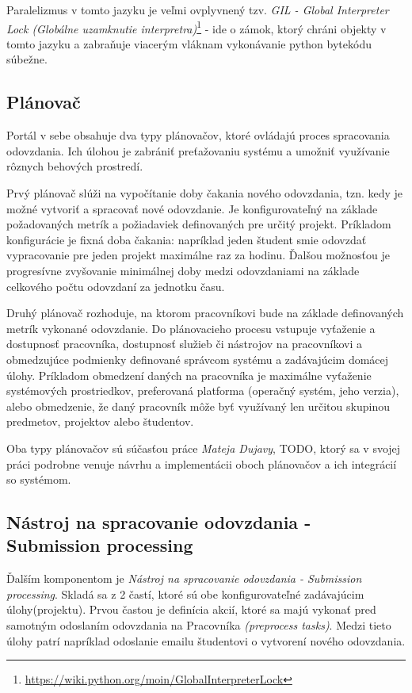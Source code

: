 \documentclass[
  digital, %
  twoside, %
  table,   %
  lof,     %
  lot,     %
]{fithesis3}
\begin{document}
Paralelizmus v tomto jazyku je veľmi ovplyvnený tzv. \emph{GIL - Global Interpreter Lock (Globálne uzamknutie interpretra)}\footnote{\url{https://wiki.python.org/moin/GlobalInterpreterLock}} - ide o zámok, ktorý chráni objekty v tomto jazyku a zabraňuje viacerým vláknam vykonávanie python bytekódu súbežne.


\subsection{Plánovač}

Portál v sebe obsahuje dva typy plánovačov, ktoré ovládajú proces spracovania odovzdania. Ich úlohou je zabrániť preťažovaniu systému a umožniť využívanie rôznych behových prostredí.

Prvý plánovač slúži na vypočítanie doby čakania nového odovzdania, tzn. kedy je možné vytvoriť a spracovať nové odovzdanie. Je konfigurovateľný na základe požadovaných metrík a požiadaviek definovaných pre určitý projekt. Príkladom konfigurácie je fixná doba čakania: napríklad jeden študent smie odovzdať vypracovanie pre jeden projekt maximálne raz za hodinu. Ďalšou možnosťou je progresívne zvyšovanie minimálnej doby medzi odovzdaniami na základe celkového počtu odovzdaní za jednotku času.

Druhý plánovač rozhoduje, na ktorom pracovníkovi bude na základe definovaných metrík vykonané odovzdanie. Do plánovacieho procesu vstupuje vyťaženie a dostupnosť pracovníka, dostupnosť služieb či nástrojov na pracovníkovi a obmedzujúce podmienky definované správcom systému a zadávajúcim domácej úlohy. Príkladom obmedzení daných na pracovníka je maximálne vyťaženie systémových prostriedkov, preferovaná platforma (operačný systém, jeho verzia), alebo obmedzenie, že daný pracovník môže byť využívaný len určitou skupinou predmetov, projektov alebo študentov. 

Oba typy plánovačov sú súčasťou práce \emph{Mateja Dujavy}, TODO, ktorý sa v svojej práci podrobne venuje návrhu a implementácii oboch plánovačov a ich integrácií so systémom.

\subsection{Nástroj na spracovanie odovzdania - Submission processing}

Ďalším komponentom je \emph{Nástroj na spracovanie odovzdania - Submission processing}. Skladá sa z 2 častí, ktoré sú obe konfigurovateľné zadávajúcim úlohy(projektu). Prvou častou je definícia akcií, ktoré sa majú vykonať pred samotným odoslaním odovzdania na Pracovníka \emph{(preprocess tasks)}. Medzi tieto úlohy patrí napríklad odoslanie emailu študentovi o vytvorení nového odovzdania.
\end{document}
